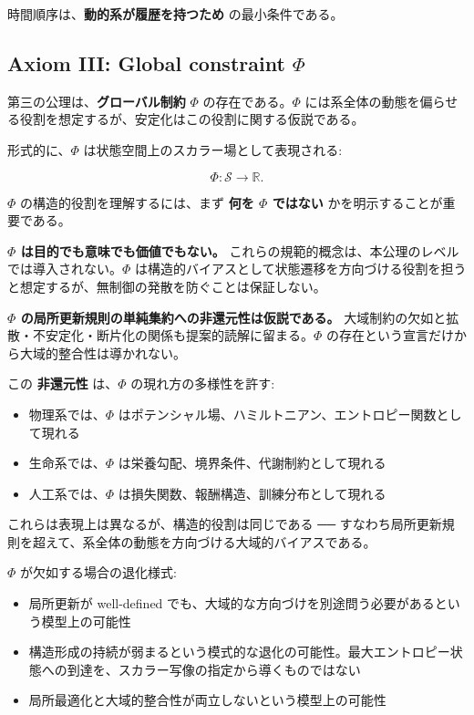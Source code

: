 時間順序は、\textbf{動的系が履歴を持つため} の最小条件である。

\subsection{Axiom III: Global constraint $\Phi$}


第三の公理は、\textbf{グローバル制約} $\Phi$ の存在である。$\Phi$ には系全体の動態を偏らせる役割を想定するが、安定化はこの役割に関する仮説である。

形式的に、$\Phi$ は状態空間上のスカラー場として表現される:

\[
\Phi : \mathcal{S} \rightarrow \mathbb{R}.
\]

$\Phi$ の構造的役割を理解するには、まず \textbf{何を $\Phi$ ではない} かを明示することが重要である。

\textbf{$\Phi$ は目的でも意味でも価値でもない。} これらの規範的概念は、本公理のレベルでは導入されない。$\Phi$ は構造的バイアスとして状態遷移を方向づける役割を担うと想定するが、無制御の発散を防ぐことは保証しない。

\textbf{$\Phi$ の局所更新規則の単純集約への非還元性は仮説である。} 大域制約の欠如と拡散・不安定化・断片化の関係も提案的読解に留まる。$\Phi$ の存在という宣言だけから大域的整合性は導かれない。

この \textbf{非還元性} は、$\Phi$ の現れ方の多様性を許す:

\begin{itemize}
\item 物理系では、$\Phi$ はポテンシャル場、ハミルトニアン、エントロピー関数として現れる
\item 生命系では、$\Phi$ は栄養勾配、境界条件、代謝制約として現れる
\item 人工系では、$\Phi$ は損失関数、報酬構造、訓練分布として現れる
\end{itemize}

これらは表現上は異なるが、構造的役割は同じである ── すなわち局所更新規則を超えて、系全体の動態を方向づける大域的バイアスである。

$\Phi$ が欠如する場合の退化様式:

\begin{itemize}
\item 局所更新が well-defined でも、大域的な方向づけを別途問う必要があるという模型上の可能性
\item 構造形成の持続が弱まるという模式的な退化の可能性。最大エントロピー状態への到達を、スカラー写像の指定から導くものではない
\item 局所最適化と大域的整合性が両立しないという模型上の可能性
\end{itemize}

